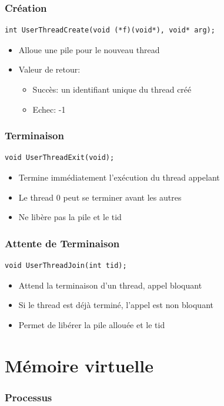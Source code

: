 \documentclass{beamer}
\begin{document}
\begin{frame}[fragile]
  \frametitle{Création}
\begin{verbatim}
int UserThreadCreate(void (*f)(void*), void* arg);
\end{verbatim}
\begin{itemize}
  \item Alloue une pile pour le nouveau thread
  \item Valeur de retour:
    \begin{itemize}
    \item Succès: un identifiant unique du thread créé
    \item Echec: -1
    \end{itemize}
\end{itemize}
\end{frame}

\begin{frame}[fragile]
  \frametitle{Terminaison}
\begin{verbatim}
void UserThreadExit(void);
\end{verbatim}
\begin{itemize}
  \item Termine immédiatement l'exécution du thread appelant
  \item Le thread 0 peut se terminer avant les autres
  \item Ne libère pas la pile et le tid
\end{itemize}
\end{frame}

\begin{frame}[fragile]
  \frametitle{Attente de Terminaison}
\begin{verbatim}
void UserThreadJoin(int tid);
\end{verbatim}
\begin{itemize}
  \item Attend la terminaison d'un thread, appel bloquant
  \item Si le thread est déjà terminé, l'appel est non bloquant
  \item Permet de libérer la pile allouée et le tid
\end{itemize}
\end{frame}

\section{Mémoire virtuelle}

\begin{frame}
  \frametitle{Processus}
\end{frame}
\end{document}
